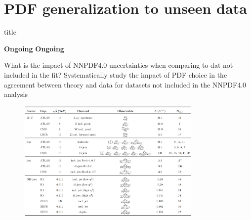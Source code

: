 \documentclass[aspectratio=43, 8pt,t]{beamer}
\newcommand{\SectionTitleFrame}[1][]{%
  \begin{frame}
    \vfill
    \centering
    \begin{beamercolorbox}[sep=8pt,center,shadow=true,rounded=true]{title}
      \usebeamerfont{title}\insertsection\par
    \end{beamercolorbox}
    \ifx\relax#1\relax\else
      \vspace{0.5cm}
      \textbf{#1}
    \fi
    \vfill
  \end{frame}
}
\begin{document}
\section*{PDF generalization to unseen data}
\SectionTitleFrame[\textbf{Ongoing}]

\begin{frame}{What is the impact of NNPDF4.0 uncertainties when comparing to dat not included in the fit?}
  Systematically study the impact of PDF choice in the agreement between theory and data for datasets not included in the NNPDF4.0 analysis

  \begin{figure}
    \includegraphics[width=0.8\textwidth]{pheno_paper_datasets.png}
  \end{figure}

\end{frame}
\end{document}
